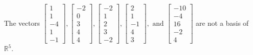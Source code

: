 \begin{exercise}
\begin{exerciseStatement}
  \end{exerciseStatement}
  \begin{exerciseAnswer}
   The vectors \(\left[\begin{array}{r}
1 \\
1 \\
-4 \\
1 \\
-1
\end{array}\right] , \left[\begin{array}{r}
-2 \\
0 \\
3 \\
4 \\
4
\end{array}\right] , \left[\begin{array}{r}
-2 \\
1 \\
2 \\
3 \\
-2
\end{array}\right] , \left[\begin{array}{r}
2 \\
1 \\
-1 \\
4 \\
3
\end{array}\right] , \text{ and } \left[\begin{array}{r}
-10 \\
-4 \\
16 \\
-2 \\
4
\end{array}\right]\) 
  	 are not  a basis of \(\mathbb{R}^5\).
  


  \end{exerciseAnswer}
\end{exercise}